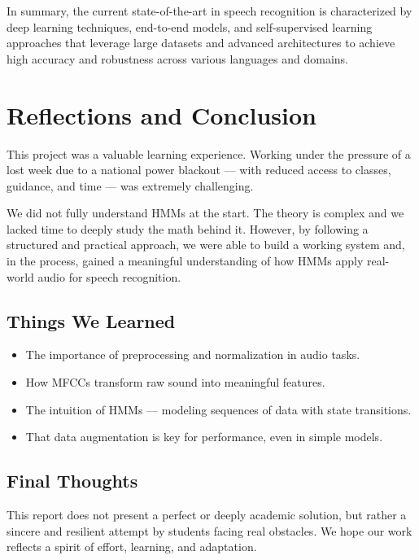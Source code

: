 \documentclass[informe,english]{practicaitic}
\begin{document}
    In summary, the current state-of-the-art in speech recognition is characterized by deep learning techniques, end-to-end models, and self-supervised learning approaches that leverage large datasets and advanced architectures to achieve high accuracy and robustness across various languages and domains.

\section{Reflections and Conclusion}

This project was a valuable learning experience. Working under the pressure of a lost week due to a national power blackout — with reduced access to classes, guidance, and time — was extremely challenging.

We did not fully understand HMMs at the start. The theory is complex and we lacked time to deeply study the math behind it. However, by following a structured and practical approach, we were able to build a working system and, in the process, gained a meaningful understanding of how HMMs apply real-world audio for speech recognition.

\subsection{Things We Learned}

\begin{itemize}
    \item The importance of preprocessing and normalization in audio tasks.
    \item How MFCCs transform raw sound into meaningful features.
    \item The intuition of HMMs — modeling sequences of data with state transitions.
    \item That data augmentation is key for performance, even in simple models.
\end{itemize}

\subsection{Final Thoughts}

This report does not present a perfect or deeply academic solution, but rather a sincere and resilient attempt by students facing real obstacles. We hope our work reflects a spirit of effort, learning, and adaptation.
\end{document}
